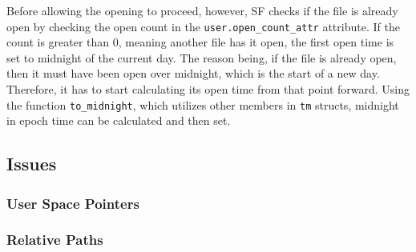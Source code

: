 Before allowing the opening to proceed, however, SF checks if the file is already open by checking the open count in the \texttt{user.open\_count\_attr} attribute. If the count is greater than 0, meaning another file has it open, the first open time is set to midnight of the current day. The reason being, if the file is already open, then it must have been open over midnight, which is the start of a new day. Therefore, it has to start calculating its open time from that point forward. Using the function \texttt{to\_midnight}, which utilizes other members in \texttt{tm} structs, midnight in epoch time can be calculated and then set.

\subsection{Issues}
\subsubsection*{User Space Pointers}

\subsubsection*{Relative Paths}